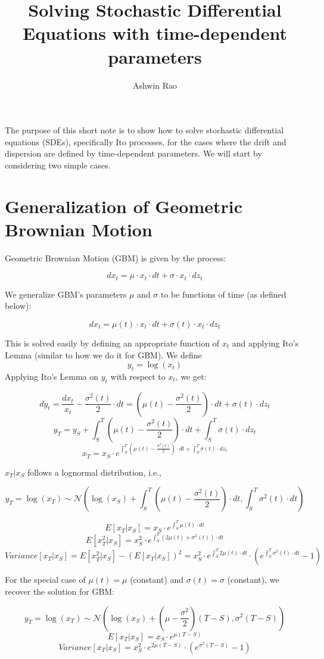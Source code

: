 \documentclass[10pt]{amsart}
\title{Solving Stochastic Differential Equations with time-dependent parameters}
\author{Ashwin Rao}
\date{} %
\begin{document}
\maketitle

The purpose of this short note is to show how to solve stochastic differential equations (SDEs), specifically Ito processes, for the cases where the drift and dispersion are defined by time-dependent parameters. We will start by considering two simple cases.

\section{Generalization of Geometric Brownian Motion}
Geometric Brownian Motion (GBM) is given by the process:

$$dx_t = \mu \cdot x_t \cdot dt + \sigma \cdot x_t \cdot dz_t$$

We generalize GBM's parameters $\mu$ and $\sigma$ to be functions of time (as defined below):

$$dx_t = \mu(t) \cdot x_t \cdot dt + \sigma(t) \cdot x_t \cdot dz_t$$

This is solved easily by defining an appropriate function of $x_t$ and applying Ito's Lemma (similar to how we do it for GBM). We define 
$$y_t = \log(x_t)$$
Applying Ito's Lemma on $y_t$ with respect to $x_t$, we get:

$$dy_t = \frac {dx_t} {x_t} - \frac {\sigma^2(t)} 2 \cdot dt = (\mu(t) - \frac {\sigma^2(t)} 2) \cdot dt + \sigma(t) \cdot dz_t$$
$$y_T = y_S + \int_S^T (\mu(t) - \frac {\sigma^2(t)} 2) \cdot dt + \int_S^T  \sigma(t) \cdot dz_t$$
$$x_T = x_S \cdot e^{\int_S^T (\mu(t) - \frac {\sigma^2(t)} 2) \cdot dt + \int_S^T  \sigma(t) \cdot dz_t}$$

$x_T | x_S$ follows a lognormal distribution, i.e., 

$$y_T = \log(x_T) \sim \mathcal{N}(\log(x_S) + \int_S^T (\mu(t) - \frac {\sigma^2(t)} 2) \cdot dt, \int_S^T  \sigma^2(t) \cdot dt)$$

$$E[x_T|x_S] = x_S \cdot e^{\int_S^T \mu(t) \cdot dt}$$
$$E[x_T^2|x_S] = x_S^2 \cdot e^{\int_S^T (2 \mu(t) + \sigma^2(t)) \cdot dt}$$
$$Variance[x_T|x_S] = E[x_T^2|x_S] - (E[x_T|x_S])^2 = x_S^2 \cdot e^{\int_S^T 2 \mu(t) \cdot dt} \cdot (e^{\int_S^T \sigma^2(t) \cdot dt} - 1)$$

For the special case of $\mu(t) = \mu$ (constant) and $\sigma(t) = \sigma$ (constant), we recover the solution for GBM:

$$y_T = \log(x_T) \sim \mathcal{N}(\log(x_S) + (\mu - \frac {\sigma^2} 2)(T-S), \sigma^2 (T-S))$$
$$E[x_T|x_S] = x_S \cdot e^{\mu (T-S)}$$
$$Variance[x_T|x_S] = x_S^2 \cdot e^{2 \mu (T-S)} \cdot (e^{\sigma^2 (T-S)} - 1)$$
\end{document}
